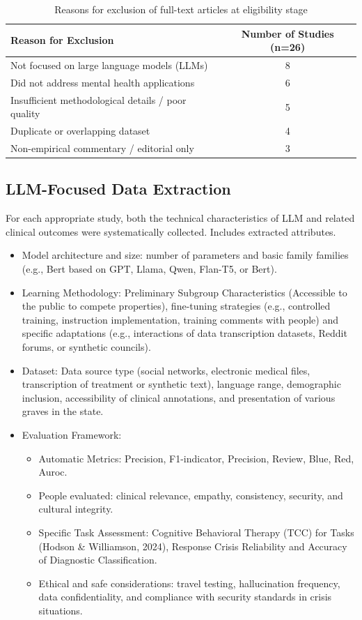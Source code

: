 \documentclass[sn-basic,authoryear]{sn-jnl}
\begin{document}
\begin{table}
\centering
\caption{Reasons for exclusion of full-text articles at eligibility stage}
\label{tab:exclusion}
\begin{tabular}{p{8cm}c}
\hline
\textbf{Reason for Exclusion} & \textbf{Number of Studies (n=26)} \\
\hline
Not focused on large language models (LLMs) & 8 \\
Did not address mental health applications & 6 \\
Insufficient methodological details / poor quality & 5 \\
Duplicate or overlapping dataset & 4 \\
Non-empirical commentary / editorial only & 3 \\
\hline
\end{tabular}
\end{table}


\subsection{LLM-Focused Data Extraction}
For each appropriate study, both the technical characteristics of LLM and related clinical outcomes were systematically collected. Includes extracted attributes.
  
\begin{itemize}
    \item Model architecture and size: number of parameters and basic family families (e.g., Bert based on GPT, Llama, Qwen, Flan-T5, or Bert).
    \item Learning Methodology: Preliminary Subgroup Characteristics (Accessible to the public to compete properties), fine-tuning strategies (e.g., controlled training, instruction implementation, training comments with people) and specific adaptations (e.g., interactions of data transcription datasets, Reddit forums, or synthetic councils).  
    \item Dataset: Data source type (social networks, electronic medical files, transcription of treatment or synthetic text), language range, demographic inclusion, accessibility of clinical annotations, and presentation of various graves in the state.
    \item Evaluation Framework:  
    \begin{itemize}
        \item Automatic Metrics: Precision, F1-indicator, Precision, Review, Blue, Red, Auroc.
        \item People evaluated: clinical relevance, empathy, consistency, security, and cultural integrity.
        \item Specific Task Assessment: Cognitive Behavioral Therapy (TCC) for Tasks  (Hodson \& Williamson, 2024), Response Crisis Reliability and Accuracy of Diagnostic Classification.
        \item Ethical and safe considerations: travel testing, hallucination frequency, data confidentiality, and compliance with security standards in crisis situations.
    \end{itemize}
             
\end{itemize}
   
\end{document}
